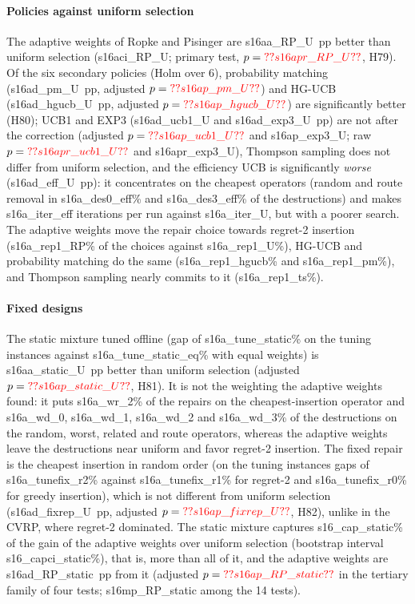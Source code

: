 \paragraph{Policies against uniform selection} The adaptive weights of Ropke and Pisinger are \num{s16aa_RP_U}~pp better than uniform selection (\num{s16aci_RP_U}; primary test, $p=\num{s16apr_RP_U}$, H79). Of the six secondary policies (Holm over 6), probability matching (\num{s16ad_pm_U}~pp, adjusted $p=\num{s16ap_pm_U}$) and HG-UCB (\num{s16ad_hgucb_U}~pp, adjusted $p=\num{s16ap_hgucb_U}$) are significantly better (H80); UCB1 and EXP3 (\num{s16ad_ucb1_U} and \num{s16ad_exp3_U}~pp) are not after the correction (adjusted $p=\num{s16ap_ucb1_U}$ and \num{s16ap_exp3_U}; raw $p=\num{s16apr_ucb1_U}$ and \num{s16apr_exp3_U}), Thompson sampling does not differ from uniform selection, and the efficiency UCB is significantly \emph{worse} (\num{s16ad_eff_U}~pp): it concentrates on the cheapest operators (random and route removal in \num{s16a_des0_eff}\% and \num{s16a_des3_eff}\% of the destructions) and makes \num{s16a_iter_eff} iterations per run against \num{s16a_iter_U}, but with a poorer search. The adaptive weights move the repair choice towards regret-2 insertion (\num{s16a_rep1_RP}\% of the choices against \num{s16a_rep1_U}\%), HG-UCB and probability matching do the same (\num{s16a_rep1_hgucb}\% and \num{s16a_rep1_pm}\%), and Thompson sampling nearly commits to it (\num{s16a_rep1_ts}\%).



\paragraph{Fixed designs} The static mixture tuned offline (gap of \num{s16a_tune_static}\% on the tuning instances against \num{s16a_tune_static_eq}\% with equal weights) is \num{s16aa_static_U}~pp better than uniform selection (adjusted $p=\num{s16ap_static_U}$, H81). It is not the weighting the adaptive weights found: it puts \num{s16a_wr_2}\% of the repairs on the cheapest-insertion operator and \num{s16a_wd_0}, \num{s16a_wd_1}, \num{s16a_wd_2} and \num{s16a_wd_3}\% of the destructions on the random, worst, related and route operators, whereas the adaptive weights leave the destructions near uniform and favor regret-2 insertion. The fixed repair is the cheapest insertion in random order (on the tuning instances gaps of \num{s16a_tunefix_r2}\% against \num{s16a_tunefix_r1}\% for regret-2 and \num{s16a_tunefix_r0}\% for greedy insertion), which is not different from uniform selection (\num{s16ad_fixrep_U}~pp, adjusted $p=\num{s16ap_fixrep_U}$, H82), unlike in the CVRP, where regret-2 dominated. The static mixture captures \num{s16_cap_static}\% of the gain of the adaptive weights over uniform selection (bootstrap interval \num{s16_capci_static}\%), that is, more than all of it, and the adaptive weights are \num{s16ad_RP_static}~pp from it (adjusted $p=\num{s16ap_RP_static}$ in the tertiary family of four tests; \num{s16mp_RP_static} among the 14 tests).

